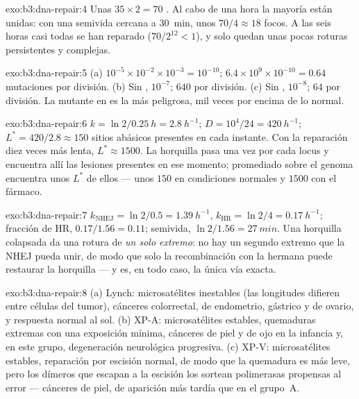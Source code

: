 \begin{solution}{exo:b3:dna-repair:4}
Unas $35\times 2 = 70$ . Al cabo de una hora la
mayoría están unidas: con una semivida cercana a \qty{30}{min}, unos
$70/4 \approx 18$ focos. A las seis horas casi todas se han reparado
($70/2^{12} < 1$), y solo quedan unas pocas roturas persistentes y
complejas.
\end{solution}

\begin{solution}{exo:b3:dna-repair:5}
(a) $10^{-5}\times 10^{-2}\times 10^{-3} = 10^{-10}$; $6.4\times
10^{9}\times 10^{-10} = 0.64$ mutaciones por división. (b) Sin
, $10^{-7}$; $640$ por división.
(c) Sin , $10^{-8}$; $64$ por división. La mutante
en  es la más peligrosa, mil veces
por encima de lo normal.
\end{solution}

\begin{solution}{exo:b3:dna-repair:6}
$k = \ln 2/\qty{0.25}{h} = \qty{2.8}{h^{-1}}$; $D = 10^{4}/24 =
\qty{420}{h^{-1}}$; $L^{*} = 420/2.8 \approx 150$ sitios abásicos
presentes en cada instante. Con la reparación diez veces más lenta,
$L^{*} \approx \num{1500}$. La horquilla pasa una vez por cada locus y
encuentra allí las lesiones presentes en ese momento; promediado sobre el
genoma encuentra unos $L^{*}$ de ellos --- unos $150$ en condiciones
normales y $\num{1500}$ con el fármaco.
\end{solution}

\begin{solution}{exo:b3:dna-repair:7}
$k_{\text{NHEJ}} = \ln 2/0.5 = \qty{1.39}{h^{-1}}$, $k_{\text{HR}} =
\ln 2/4 = \qty{0.17}{h^{-1}}$; fracción de HR, $0.17/1.56 = 0.11$;
semivida, $\ln 2/1.56 = \qty{27}{min}$. Una horquilla colapsada da una
rotura de \emph{un solo extremo}: no hay un segundo extremo que la NHEJ
pueda unir, de modo que solo la recombinación con la hermana puede
restaurar la horquilla --- y es, en todo caso, la única vía exacta.
\end{solution}

\begin{solution}{exo:b3:dna-repair:8}
(a) Lynch: microsatélites inestables (las longitudes difieren entre
células del tumor), cánceres colorrectal, de endometrio, gástrico y de
ovario, y respuesta normal al sol. (b) XP-A: microsatélites estables,
quemaduras extremas con una exposición mínima, cánceres de piel y de ojo
en la infancia y, en este grupo, degeneración neurológica progresiva.
(c) XP-V: microsatélites estables, reparación por escisión normal, de
modo que la quemadura es más leve, pero los dímeros que escapan a la
escisión los sortean polimerasas propensas al error --- cánceres de piel,
de aparición más tardía que en el grupo~A.
\end{solution}

